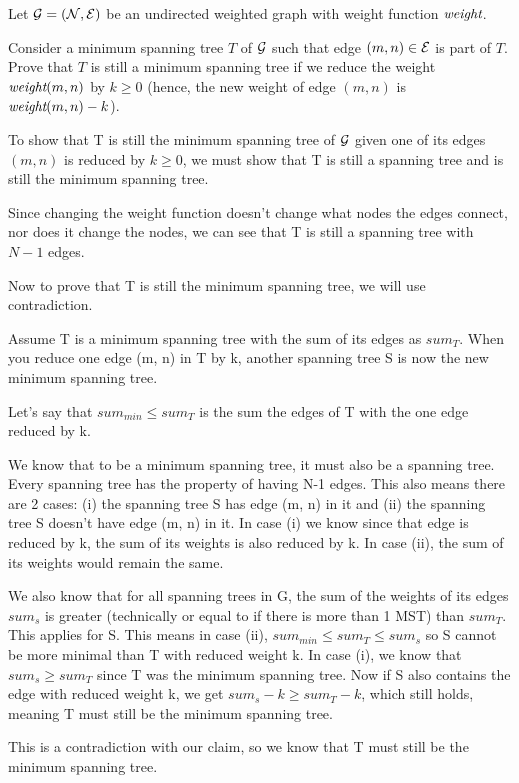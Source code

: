 \begin{problem}
Let $\mathcal{G} = (\mathcal{N}, \mathcal{E})$ be an undirected weighted graph with weight function $\mathord{\textit{weight}}$. 
\begin{questions}
\item Consider a minimum spanning tree $T$ of $\mathcal{G}$ such that edge $(m, n) \in \mathcal{E}$ is part of $T$. Prove that $T$ is still a minimum spanning tree if we reduce the weight $\mathord{\textit{weight}}{(m, n)}$ by $k \geq 0$ (hence, the new weight of edge $(m, n)$ is $\mathord{\textit{weight}}{(m, n)} - k$).

To show that T is still the minimum spanning tree of $\mathcal{G}$ given one of its edges $(m, n)$ is reduced by $k \geq 0$, we must show that T is still a spanning tree and is still the minimum spanning tree.

Since changing the weight function doesn't change what nodes the edges connect, nor does it change the nodes, we can see that T is still a spanning tree with $N-1$ edges.

Now to prove that T is still the minimum spanning tree, we will use contradiction.

Assume T is a minimum spanning tree with the sum of its edges as $sum_T$. When you reduce one edge (m, n) in T by k, another spanning tree S is now the new minimum spanning tree.

Let's say that $sum_{min} \leq sum_T$ is the sum the edges of T with the one edge reduced by k. 

We know that to be a minimum spanning tree, it must also be a spanning tree. 
Every spanning tree has the property of having N-1 edges. This also means there are 2 cases: 
(i) the spanning tree S has edge (m, n) in it and (ii) the spanning tree S doesn't have edge (m, n) in it.
In case (i) we know since that edge is reduced by k, the sum of its weights is also reduced by k. In case (ii), the sum of its weights would remain the same.

We also know that for all spanning trees in G, the sum of the weights of its edges $sum_s$ is greater (technically or equal to if there is more than 1 MST) than $sum_T$. This applies for S.
This means in case (ii), $sum_{min} \leq sum_T \leq sum_s$ so S cannot be more minimal than T with reduced weight k.
In case (i), we know that $sum_s \geq sum_T$ since T was the minimum spanning tree. Now if S also contains the edge with reduced weight k, we get
$sum_s - k \geq sum_T - k$, which still holds, meaning T must still be the minimum spanning tree.

This is a contradiction with our claim, so we know that T must still be the minimum spanning tree.


\end{questions}
\end{problem}
